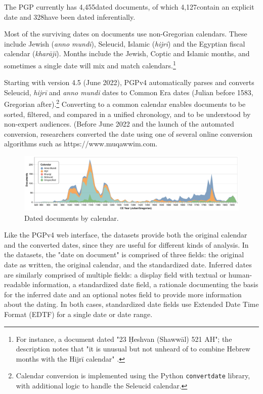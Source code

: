 \documentclass{article}
\def\totalDatedDocs{4,455}
\def\totalDateOnDoc{4,127}
\def\totalInferredDate{328}
\begin{document}
The PGP currently has \totalDatedDocs\space dated documents, of which \totalDateOnDoc\space contain an explicit date and \totalInferredDate\space have been dated inferentially.  

Most of the surviving dates on documents use non-Gregorian calendars. These include Jewish (\textit{anno mundi}),  Seleucid, Islamic (\textit{hijrī}) and the Egyptian fiscal calendar (\textit{kharājī}). Months include the Jewish, Coptic and Islamic months, and sometimes a single date will mix and match calendars.\footnote{For instance, a document dated "23 Ḥeshvan (Shawwāl) 521 AH";  the description notes that "it is unusual but not unheard of to combine Hebrew months with the Hijrī calendar" \autocite{noauthor_legal_1127} .} 

Starting with version 4.5 (June 2022), PGPv4 automatically parses and converts Seleucid, \textit{hijrī} and \textit{anno mundi} dates to Common Era dates (Julian before 1583, Gregorian after).\footnote{Calendar conversion is implemented using the Python \texttt{convertdate} library, with additional logic to handle the Seleucid calendar.} Converting to a common calendar enables documents to be sorted, filtered, and compared in a unified chronology, and to be understood by non-expert audiences. (Before June 2022 and the launch of the automated conversion, researchers converted the date using one of several online conversion algorithms such as https://www.muqawwim.com. 

\begin{figure}[!hbt]
  \centering
  \includegraphics[width=\textwidth]{charts/dated_docs_by_cal.pdf}
  \caption{Dated documents by calendar.}
  \label{fig:docs_dating_combined}
\end{figure}

Like the PGPv4 web interface, the datasets provide both the original calendar and the converted dates, since they are useful for different kinds of analysis. In the datasets, the "date on document" is comprised of three fields: the original date as written, the original calendar, and the standardized date. Inferred dates are similarly comprised of multiple fields: a display field with textual or human-readable information, a standardized date field, a rationale documenting the basis for the inferred date and an optional notes field to provide more information about the dating. In both cases, standardized date fields use Extended Date Time Format (EDTF) for a single date or date range.
\end{document}
